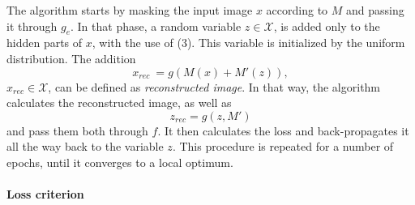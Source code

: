 The algorithm starts by masking the input image $x$ according to $M$ and passing it through $g_e$. In that phase, a random variable $z \in \mathcal{X}$, is added only to the hidden parts of $x$, with the use of (3). This variable is initialized by the uniform distribution. The addition  
\begin{equation}
    x_{rec} \:= g(M(x) + M'(z)),
\end{equation}
$x_{rec} \in \mathcal{X}$, can be defined as \emph{reconstructed image}. In that way, the algorithm calculates the reconstructed image, as well as
\begin{equation}
    z_{rec} = g(z, M')
\end{equation} and pass them both through $f$. It then calculates the loss and back-propagates it all the way back to the variable $z$. This procedure is repeated for a number of epochs, until it converges to a local optimum.

\paragraph{Loss criterion}

